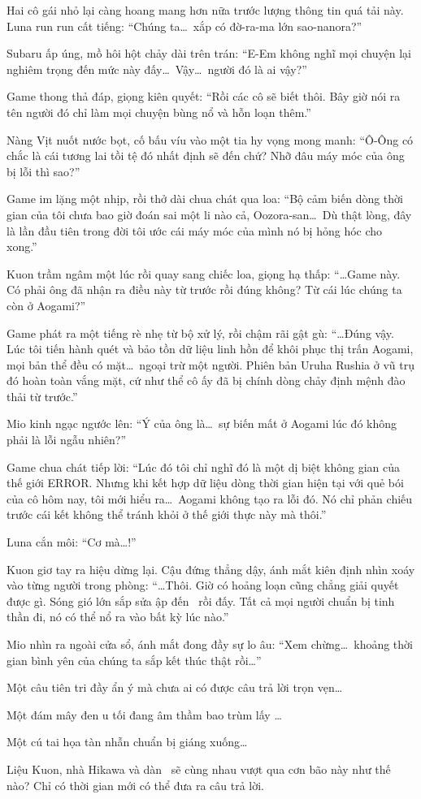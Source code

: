\documentclass[../main.tex]{subfiles}
\begin{document}
Hai cô gái nhỏ lại càng hoang mang hơn nữa trước lượng thông tin quá tải này. Luna run run cất tiếng: ``Chúng ta\dots\ xắp có đờ-ra-ma lớn sao-nanora?''

Subaru ấp úng, mồ hôi hột chảy dài trên trán: ``E-Em không nghĩ mọi chuyện lại nghiêm trọng đến mức này đấy\dots\ Vậy\dots\ người đó là ai vậy?''

Game thong thả đáp, giọng kiên quyết: ``Rồi các cô sẽ biết thôi. Bây giờ nói ra tên người đó chỉ làm mọi chuyện bùng nổ và hỗn loạn thêm.''

Nàng Vịt nuốt nước bọt, cố bấu víu vào một tia hy vọng mong manh: ``Ô-Ông có chắc là cái tương lai tồi tệ đó nhất định sẽ đến chứ? Nhỡ đâu máy móc của ông bị lỗi thì sao?''

Game im lặng một nhịp, rồi thở dài chua chát qua loa: ``Bộ cảm biến dòng thời gian của tôi chưa bao giờ đoán sai một li nào cả, Oozora-san\dots\ Dù thật lòng, đây là lần đầu tiên trong đời tôi ước cái máy móc của mình nó bị hỏng hóc cho xong.''

Kuon trầm ngâm một lúc rồi quay sang chiếc loa, giọng hạ thấp: ``\dots Game này. Có phải ông đã nhận ra điều này từ trước rồi đúng không? Từ cái lúc chúng ta còn ở Aogami?''

Game phát ra một tiếng rè nhẹ từ bộ xử lý, rồi chậm rãi gật gù: ``\dots Đúng vậy. Lúc tôi tiến hành quét và bảo tồn dữ liệu linh hồn để khôi phục thị trấn Aogami, mọi bản thể đều có mặt\dots\ ngoại trừ một người. Phiên bản Uruha Rushia ở vũ trụ đó hoàn toàn vắng mặt, cứ như thể cô ấy đã bị chính dòng chảy định mệnh đào thải từ trước.''

Mio kinh ngạc ngước lên: ``Ý của ông là\dots\ sự biến mất ở Aogami lúc đó không phải là lỗi ngẫu nhiên?''

Game chua chát tiếp lời: ``Lúc đó tôi chỉ nghĩ đó là một dị biệt không gian của thế giới ERROR. Nhưng khi kết hợp dữ liệu dòng thời gian hiện tại với quẻ bói của cô hôm nay, tôi mới hiểu ra\dots\ Aogami không tạo ra lỗi đó. Nó chỉ phản chiếu trước cái kết không thể tránh khỏi ở thế giới thực này mà thôi.''

Luna cắn môi: ``Cơ mà\dots!''

Kuon giơ tay ra hiệu dừng lại. Cậu đứng thẳng dậy, ánh mắt kiên định nhìn xoáy vào từng người trong phòng: ``\dots Thôi. Giờ có hoảng loạn cũng chẳng giải quyết được gì. Sóng gió lớn sắp sửa ập đến \hll\ rồi đấy. Tất cả mọi người chuẩn bị tinh thần đi, nó có thể nổ ra vào bất kỳ lúc nào.''

Mio nhìn ra ngoài cửa sổ, ánh mắt đong đầy sự lo âu: ``Xem chừng\dots\ khoảng thời gian bình yên của chúng ta sắp kết thúc thật rồi\dots''

\il

Một câu tiên tri đầy ẩn ý mà chưa ai có được câu trả lời trọn vẹn\dots

Một đám mây đen u tối đang âm thầm bao trùm lấy \hll\dots

Một cú tai họa tàn nhẫn chuẩn bị giáng xuống\dots

Liệu Kuon, nhà Hikawa và dàn \hll\ sẽ cùng nhau vượt qua cơn bão này như thế nào? Chỉ có thời gian mới có thể đưa ra câu trả lời.
\end{document}
